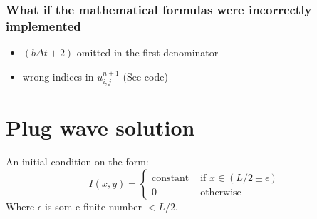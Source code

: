 \documentclass[a4paper]{article}
\begin{document}
\subsubsection{What if the mathematical formulas were incorrectly implemented}
\begin{itemize}
\item $(b\Delta t +2)$ omitted in the first denominator
\item wrong indices in $u_{i, j}^{n+1}$ (See code)
\end{itemize}

\section{Plug wave solution}
An initial condition on the form:
\begin{equation}
I(x, y) = 
\begin{cases}
\text{constant} & \text{ if } x\in (L/2\pm\epsilon) \\
0 & \text{ otherwise}
\end{cases}	
\end{equation}
Where $\epsilon$ is som e finite number $< L/2$.
\end{document}
